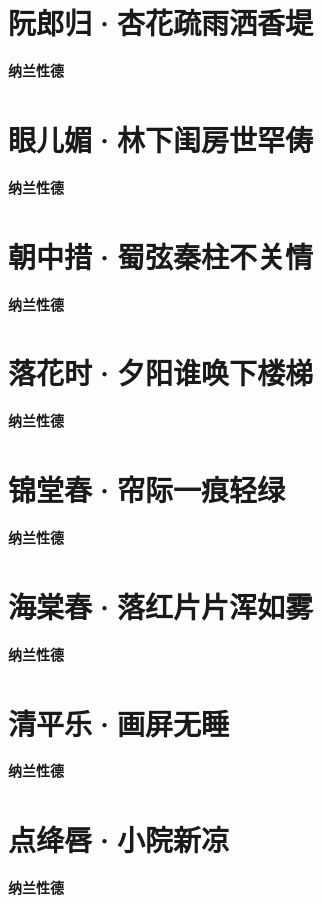 \documentclass[12pt,a4paper]{ctexbook}
\begin{document}
\section{阮郎归·杏花疏雨洒香堤}
\textbf{纳兰性德}\par\vspace{0.5em}

\section{眼儿媚·林下闺房世罕俦}
\textbf{纳兰性德}\par\vspace{0.5em}

\section{朝中措·蜀弦秦柱不关情}
\textbf{纳兰性德}\par\vspace{0.5em}

\section{ 落花时·夕阳谁唤下楼梯 }
\textbf{纳兰性德}\par\vspace{0.5em}

\section{ 锦堂春·帘际一痕轻绿 }
\textbf{纳兰性德}\par\vspace{0.5em}

\section{ 海棠春·落红片片浑如雾 }
\textbf{纳兰性德}\par\vspace{0.5em}

\section{清平乐·画屏无睡}
\textbf{纳兰性德}\par\vspace{0.5em}

\section{点绛唇·小院新凉}
\textbf{纳兰性德}\par\vspace{0.5em}
\end{document}
